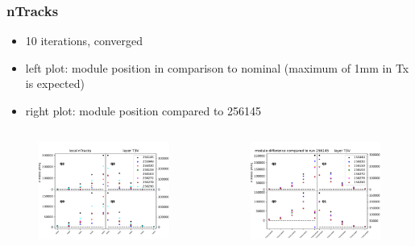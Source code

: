 \documentclass[aspectratio=1610, 12pt]{beamer}
\begin{document}
\begin{frame}\frametitle{nTracks}
  \begin{itemize}
    \item 10 iterations, converged
    \item left plot: module position in comparison to nominal (maximum of 1mm in Tx is expected)
    \item right plot: module position compared to 256145
  \end{itemize}
  \begin{columns}
    \begin{column}[c]{0.48\textwidth}
      \begin{figure}
        \includegraphics[width=\textwidth]{plots/relative_pos/n_Tracks_T3V.pdf}
      \end{figure}
    \end{column}
    \begin{column}[c]{0.48\textwidth}
      \begin{figure}
        \includegraphics[width=\textwidth]{plots/outfiles_comparison/nTracks_diff_diff_plots_T3V.pdf}
      \end{figure}
    \end{column}
  \end{columns}
\end{frame}
\end{document}
